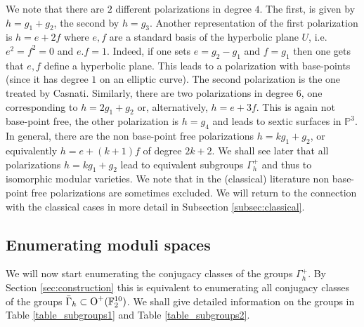 \documentclass[a4paper,11pt]{article}
\newcommand{\FF}{\mathbb F}
\newcommand{\PP}{\mathbb P}
\newcommand{\Orth}{\mathop{\null\mathrm {O}}\nolimits}
\begin{document}
We note that there are $2$ different polarizations in degree $4$. The first, is given by $h=g_1 + g_2$, the second by $h=g_3$.
Another representation of the first polarization is $h=e+2f$ where $e,f$ are a standard
basis of the hyperbolic plane $U$, i.e. $e^2=f^2=0$ and $e.f=1$. Indeed, if one sets $e = g_2-g_1$ and $f = g_1$
then one gets that $e,f$ define a hyperbolic plane.
This leads to a polarization with base-points (since it has degree $1$ on an elliptic curve).
The second polarization is the one treated by Casnati. Similarly, there are two polarizations in degree $6$, one corresponding to  $h=2g_1+g_2$ or,
alternatively, $h=e+3f$. This is again not base-point free, the other polarization is $h= g_4$ and leads to sextic surfaces in $\PP^3$.
In general, there are the non base-point free polarizations $h = k g_1 + g_2$, or equivalently $h=e+(k+1)f$ of degree $2k+2$.
We shall see later that all polarizations $h = k g_1 + g_2$ lead to equivalent
subgroups $\Gamma_h^+$ and thus to isomorphic modular varieties.
We note that in the (classical) literature non base-point free polarizations are sometimes excluded.
We will return to the connection with the classical cases in more detail in Subsection \ref{subsec:classical}.

\subsection{Enumerating moduli spaces}\label{subsec:enumspaces2}

We will now start enumerating the conjugacy classes of the groups $\Gamma_h^+$. By Section \ref{sec:construction} this is equivalent to enumerating all conjugacy classes of the groups
$\bar \Gamma_h \subset \Orth^+(\FF_2^{10})$.
We shall give detailed information on the groups in Table \ref{table_subgroups1} and Table \ref{table_subgroups2}.
\end{document}
